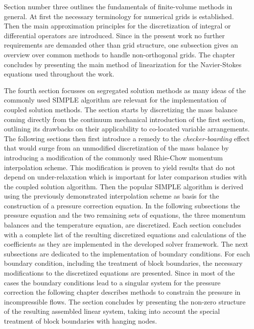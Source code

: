 Section number three outlines the fundamentals of finite-volume methods in general. At first the necessary terminology for numerical grids is established. Then the main approximation principles for the discretization of integral or differential operators are introduced. Since in the present work no further requirements are demanded other than grid structure, one subsection gives an overview over common methods to handle non-orthogonal grids. The chapter concludes by presenting the main method of linearization for the Navier-Stokes equations used throughout the work.

The fourth section focusses on segregated solution methods as many ideas of the commonly used SIMPLE algorithm are relevant for the implementation of coupled solution methods. The section starts by discretizing the mass balance coming directly from the continuum mechanical introduction of the first section, outlining its drawbacks on their applicability to co-located variable arrangements. The following sections then first introduce a remedy to the \emph{checker-boarding} effect that would surge from an unmodified discretization of the mass balance by introducing a modification of the commonly used Rhie-Chow \cite{rhie82} momentum interpolation scheme. This modification is proven to yield results that do not depend on under-relaxation which is important for later comparison studies with the coupled solution algorithm. Then the popular SIMPLE algorithm is derived using the previously demonstrated interpolation scheme as basis for the construction of a pressure correction equation. In the following subsections the pressure equation and the two remaining sets of equations, the three momentum balances and the temperature equation, are discretized. Each section concludes with a complete list of the resulting discretized equations and calculations of the coefficients as they are implemented in the developed solver framework. The next subsections are dedicated to the implementation of boundary conditions. For each boundary condition, including the treatment of block boundaries, the necessary modifications to the discretized equations are presented. Since in most of the cases the boundary conditions lead to a singular system for the pressure correction the following chapter describes methods to constrain the pressure in incompressible flows. The section concludes by presenting the non-zero structure of the resulting assembled linear system, taking into account the special treatment of block boundaries with hanging nodes.

